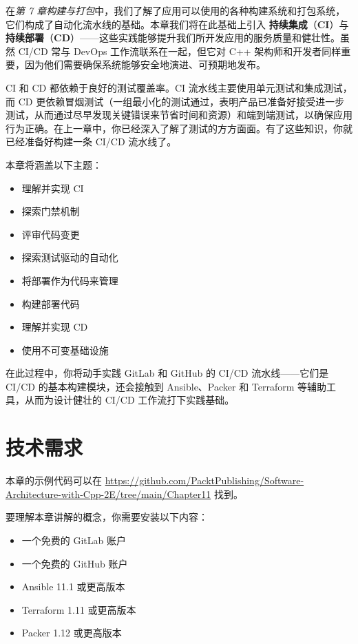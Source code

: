 在\emph{第 7 章}\emph{构建与打包}中，我们了解了应用可以使用的各种构建系统和打包系统，它们构成了自动化流水线的基础。本章我们将在此基础上引入 \textbf{持续集成}（\textbf{CI}）与 \textbf{持续部署}（\textbf{CD}）——这些实践能够提升我们所开发应用的服务质量和健壮性。虽然 CI/CD 常与 DevOps 工作流联系在一起，但它对 C++ 架构师和开发者同样重要，因为他们需要确保系统能够安全地演进、可预期地发布。

CI 和 CD 都依赖于良好的测试覆盖率。CI 流水线主要使用单元测试和集成测试，而 CD 更依赖冒烟测试（一组最小化的测试通过，表明产品已准备好接受进一步测试，从而通过尽早发现关键错误来节省时间和资源）和端到端测试，以确保应用行为正确。在上一章中，你已经深入了解了测试的方方面面。有了这些知识，你就已经准备好构建一条 CI/CD 流水线了。

本章将涵盖以下主题：

\begin{itemize}
\item 理解并实现 CI
\item 探索门禁机制
\item 评审代码变更
\item 探索测试驱动的自动化
\item 将部署作为代码来管理
\item 构建部署代码
\item 理解并实现 CD
\item 使用不可变基础设施
\end{itemize}

在此过程中，你将动手实践 GitLab 和 GitHub 的 CI/CD 流水线——它们是 CI/CD 的基本构建模块，还会接触到 Ansible、Packer 和 Terraform 等辅助工具，从而为设计健壮的 CI/CD 工作流打下实践基础。

\section{技术需求}

本章的示例代码可以在 \href{https://github.com/PacktPublishing/Software-Architecture-with-Cpp-2E/tree/main/Chapter11}{https://github.com/PacktPublishing/Software-Architecture-with-Cpp-2E/tree/main/Chapter11} 找到。

要理解本章讲解的概念，你需要安装以下内容：

\begin{itemize}
\item 一个免费的 GitLab 账户
\item 一个免费的 GitHub 账户
\item Ansible 11.1 或更高版本
\item Terraform 1.11 或更高版本
\item Packer 1.12 或更高版本
\end{itemize}

